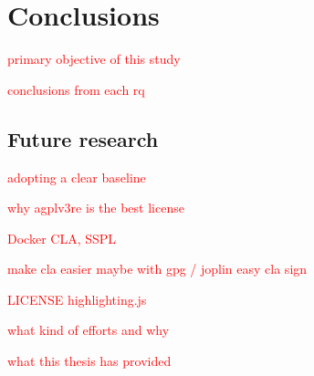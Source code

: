 \chapter{Conclusions\label{conclusions}}
\textcolor{red}{primary objective of this study}

\textcolor{red}{conclusions from each rq}


\section{Future research}
\textcolor{red}{adopting a clear baseline}

\textcolor{red}{why agplv3re is the best license}

\textcolor{red}{Docker CLA, SSPL}

\textcolor{red}{make cla easier maybe with gpg / joplin easy cla sign}

\textcolor{red}{LICENSE highlighting.js}

\textcolor{red}{what kind of efforts and why}

\textcolor{red}{what this thesis has provided}